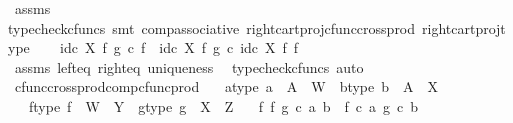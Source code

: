 \begin{isabellebody}
\ assms\ \isamarkupfalse%
{\isacharparenleft}{\kern0pt}typecheck{\isacharunderscore}{\kern0pt}cfuncs{\isacharcomma}{\kern0pt}\ smt\ comp{\isacharunderscore}{\kern0pt}associative{}\ right{\isacharunderscore}{\kern0pt}cart{\isacharunderscore}{\kern0pt}proj{\isacharunderscore}{\kern0pt}cfunc{\isacharunderscore}{\kern0pt}cross{\isacharunderscore}{\kern0pt}prod\ right{\isacharunderscore}{\kern0pt}cart{\isacharunderscore}{\kern0pt}proj{\isacharunderscore}{\kern0pt}type{\isacharparenright}{\kern0pt}\isanewline
\ \ \isamarkupfalse%
\ {\isachardoublequoteopen}id\isactrlsub c\ X\ {\isasymtimes}\isactrlsub f\ g\ {\isasymcirc}\isactrlsub c\ f\ {\isacharequal}{\kern0pt}\ {\isacharparenleft}{\kern0pt}id\isactrlsub c\ X\ {\isasymtimes}\isactrlsub f\ g{\isacharparenright}{\kern0pt}\ {\isasymcirc}\isactrlsub c\ id\isactrlsub c\ X\ {\isasymtimes}\isactrlsub f\ f{\isachardoublequoteclose}\isanewline
\ \ \ \ \isamarkupfalse%
\ assms\ left{\isacharunderscore}{\kern0pt}eq\ right{\isacharunderscore}{\kern0pt}eq\ uniqueness\ \isamarkupfalse%
\ {\isacharparenleft}{\kern0pt}typecheck{\isacharunderscore}{\kern0pt}cfuncs{\isacharcomma}{\kern0pt}\ auto{\isacharparenright}{\kern0pt}\isanewline
{}\isamarkupfalse%
%
\endisatagproof
{\isafoldproof}%
%
\isadelimproof
\isanewline
%
\endisadelimproof
\isanewline
{}\isamarkupfalse%
\ cfunc{\isacharunderscore}{\kern0pt}cross{\isacharunderscore}{\kern0pt}prod{\isacharunderscore}{\kern0pt}comp{\isacharunderscore}{\kern0pt}cfunc{\isacharunderscore}{\kern0pt}prod{\isacharcolon}{\kern0pt}\isanewline
\ \ \ a{\isacharunderscore}{\kern0pt}type{\isacharcolon}{\kern0pt}\ {\isachardoublequoteopen}a\ {\isacharcolon}{\kern0pt}\ A\ {\isasymrightarrow}\ W{\isachardoublequoteclose}\ \ b{\isacharunderscore}{\kern0pt}type{\isacharcolon}{\kern0pt}\ {\isachardoublequoteopen}b\ {\isacharcolon}{\kern0pt}\ A\ {\isasymrightarrow}\ X{\isachardoublequoteclose}\isanewline
\ \ \ f{\isacharunderscore}{\kern0pt}type{\isacharcolon}{\kern0pt}\ {\isachardoublequoteopen}f\ {\isacharcolon}{\kern0pt}\ W\ {\isasymrightarrow}\ Y{\isachardoublequoteclose}\ \ g{\isacharunderscore}{\kern0pt}type{\isacharcolon}{\kern0pt}\ {\isachardoublequoteopen}g\ {\isacharcolon}{\kern0pt}\ X\ {\isasymrightarrow}\ Z{\isachardoublequoteclose}\isanewline
\ \ \ {\isachardoublequoteopen}{\isacharparenleft}{\kern0pt}f\ {\isasymtimes}\isactrlsub f\ g{\isacharparenright}{\kern0pt}\ {\isasymcirc}\isactrlsub c\ {\isasymlangle}a{\isacharcomma}{\kern0pt}\ b{\isasymrangle}\ {\isacharequal}{\kern0pt}\ {\isasymlangle}f\ {\isasymcirc}\isactrlsub c\ a{\isacharcomma}{\kern0pt}\ g\ {\isasymcirc}\isactrlsub c\ b{\isasymrangle}{\isachardoublequoteclose}\isanewline

\end{isabellebody}
